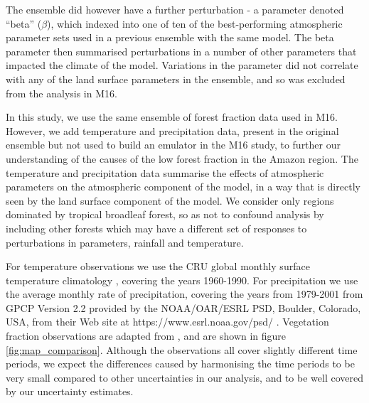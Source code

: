 \documentclass[gmd, manuscript]{copernicus}
\begin{document}
The ensemble did however have a further perturbation - a parameter denoted ``beta'' ($\beta$), which indexed into one of ten of the best-performing atmospheric parameter sets used in a previous ensemble with the same model. The beta parameter then summarised perturbations in a number of other parameters that impacted the climate of the model. Variations in the  parameter did not correlate with any of the land surface parameters in the ensemble, and so  was excluded from the analysis in M16.
 
In this study, we use the same ensemble of forest fraction data used in M16. However, we add temperature and precipitation data, present in the original ensemble but not used to build an emulator in the M16 study, to further our understanding of the causes of the low forest fraction in the Amazon region. The temperature and precipitation data summarise the effects of atmospheric parameters on the atmospheric component of the model, in a way that is directly seen by the land surface component of the model. We consider only regions dominated by tropical broadleaf forest, so as not to confound analysis by including other forests which may have a different set of responses to perturbations in parameters, rainfall and temperature.

For temperature observations we use the CRU global monthly surface temperature climatology \cite{jones1999face}, covering the years 1960-1990. For precipitation we use the average monthly rate of precipitation, covering the years from 1979-2001 from GPCP Version 2.2 provided by the NOAA/OAR/ESRL PSD, Boulder, Colorado, USA, from their Web site at https://www.esrl.noaa.gov/psd/ \cite{Adler2003}. Vegetation fraction observations are adapted from \cite{loveland2000landcover}, and are shown in figure \ref{fig:map_comparison}. Although the observations all cover slightly different time periods, we expect the differences caused by harmonising the time periods to be very small compared to other uncertainties in our analysis, and to be well covered by our uncertainty estimates.
\end{document}
